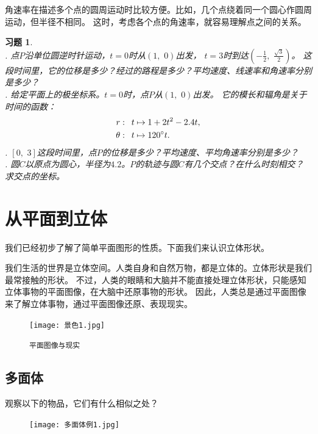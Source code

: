 \documentclass[12pt,UTF8]{ctexbook}
\newtheorem{xt}{习题}[section]
\begin{document}
角速率在描述多个点的圆周运动时比较方便。比如，几个点绕着同一个圆心作圆周运动，但半径不相同。
这时，考虑各个点的角速率，就容易理解点之间的关系。

\begin{xt}
    \mbox{} \\
    . 点$P$沿单位圆逆时针运动，$t=0$时从$(1,\,\,0)$出发，
    $t=3$时到达$\left(-\frac{1}{2},\,\,\frac{\sqrt{3}}{2}\right)$。
    这段时间里，它的位移是多少？经过的路程是多少？平均速度、线速率和角速率分别是多少？\\
    . 给定平面上的极坐标系。$t=0$时，点$P$从$(1,\,\,0)$出发。
    它的模长和辐角是关于时间的函数：
    \begin{align}
        r &: \,\,\, t \mapsto 1 + 2t^2 - 2.4t, \notag \\
        \theta &: \,\,\, t\mapsto 120^\circ t. \notag
    \end{align}
    . $[0, \,\, 3]$这段时间里，点$P$的位移是多少？平均速度、平均角速率分别是多少？\\
    . 圆$C$以原点为圆心，半径为$4.2$。$P$的轨迹与圆$C$有几个交点？在什么时刻相交？求交点的坐标。
\end{xt}

\chapter{从平面到立体}

我们已经初步了解了简单平面图形的性质。下面我们来认识立体形状。

我们生活的世界是立体空间。人类自身和自然万物，都是立体的。立体形状是我们最常接触的形状。
不过，人类的眼睛和大脑并不能直接处理立体形状，只能感知立体事物的平面图像，在大脑中还原事物的形状。
因此，人类总是通过平面图像来了解立体事物，通过平面图像还原、表现现实。

\begin{figure}[h] %
    \vspace{4pt}
    \centering
    \texttt{[image: 景色1.jpg]}
    \caption*{\texttt{平面图像与现实}}
\end{figure}

\section{多面体}
观察以下的物品，它们有什么相似之处？

\begin{figure}[h] %
    \vspace{4pt}
    \centering
    \texttt{[image: 多面体例1.jpg]}
\end{figure}
\end{document}
